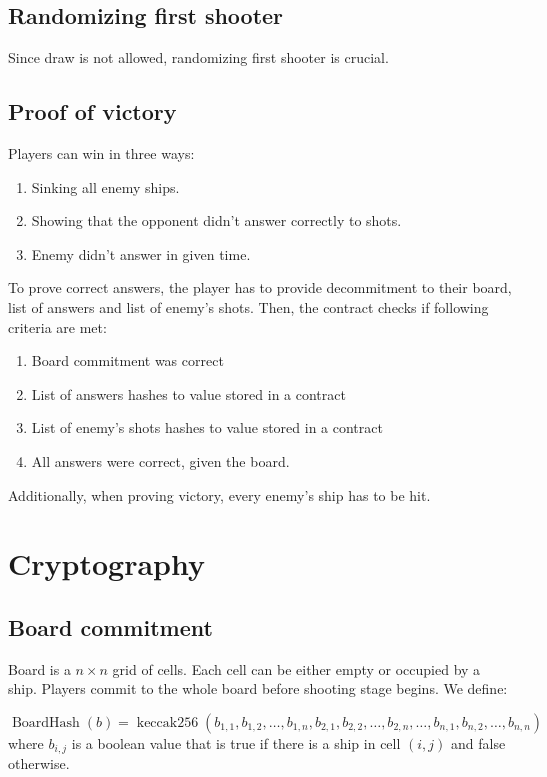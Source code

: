 \documentclass{article}
\begin{document}
    \subsection{Randomizing first shooter}

    Since draw is not allowed, randomizing first shooter is crucial.

    \subsection{Proof of victory}

    Players can win in three ways:
    \begin{enumerate}
        \item Sinking all enemy ships.
        \item Showing that the opponent didn't answer correctly to shots.
        \item Enemy didn't answer in given time.
    \end{enumerate}
    To prove correct answers, the player has to provide decommitment to their board, list of answers and list of enemy's shots. Then, the contract checks if following criteria are met:
    \begin{enumerate}
        \item Board commitment was correct
        \item List of answers hashes to value stored in a contract
        \item List of enemy's shots hashes to value stored in a contract
        \item All answers were correct, given the board.
    \end{enumerate}
    Additionally, when proving victory, every enemy's ship has to be hit.

    \section{Cryptography}

    \subsection{Board commitment}
    Board is a $n \times n$ grid of cells. Each cell can be either empty or occupied by a ship. Players commit to the whole board before shooting stage begins. We define:

    \[ \operatorname{BoardHash}(b) = \operatorname{keccak256}(b_{1,1}, b_{1,2}, \ldots, b_{1,n}, b_{2,1}, b_{2,2}, \ldots, b_{2,n}, \ldots, b_{n,1}, b_{n,2}, \ldots, b_{n,n}) \]
    where $b_{i,j}$ is a boolean value that is true if there is a ship in cell $(i,j)$ and false otherwise.
    \\
\end{document}
